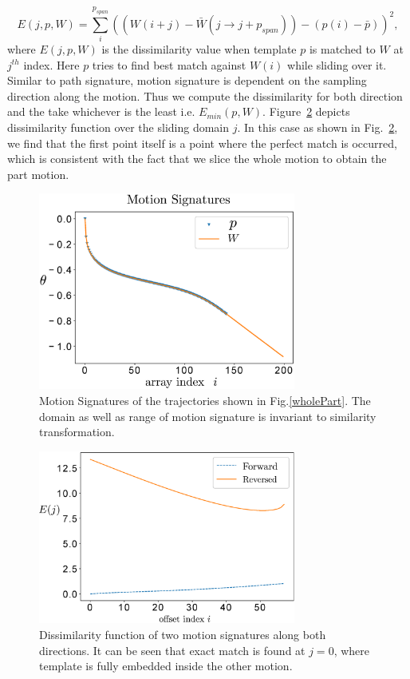 \documentclass[twocolumn,10pt]{asme2e}
\begin{document}
\begin{equation}\label{mccEq}
  E(j, p, W) = \sum_{i}^{p_{span}} {((W(i+j) - \bar{W}(j\to j + p_{span})) - (p(i) - \bar{p}))}^2,
\end{equation}
where $E(j, p, W)$ is the dissimilarity value when template $p$ is matched to $W$ at $j^{th}$ index. Here $p$ tries to find best match against $W(i)$ while sliding over it.
Similar to path signature, motion signature is dependent on the sampling direction along the motion. Thus we compute the dissimilarity for both direction and the take whichever is the least i.e. $E_{min}(p, W)$.
Figure~\ref{mcc} depicts dissimilarity function over the sliding domain $j$.
In this case as shown in Fig.~\ref{mcc}, we find that the first point itself is a point where the perfect match is occurred, which is consistent with the fact that we slice the whole motion to obtain the part motion.

\begin{figure}
\centering
\includegraphics[width=240pt]{figure/fig_motion_signatures.eps}
  \caption{Motion Signatures of the trajectories shown in Fig.\ref{wholePart}. The domain as well as range of motion signature is invariant to similarity transformation.}
\label{motionSignature}
\end{figure}

\begin{figure}
\centering
\includegraphics[width=240pt]{figure/fig_mcc.eps}
  \caption{Dissimilarity function of two motion signatures along both directions. It can be seen that exact match is found at $j=0$, where template is fully embedded inside the other motion.}
\label{mcc}
\end{figure}
\end{document}
